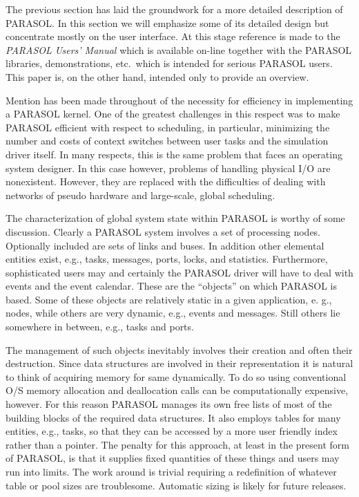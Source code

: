 \documentclass[11pt]{article}
\begin{document}
The previous section has laid the groundwork for a more detailed description of PARASOL. In
this section we will emphasize some of its detailed design but concentrate mostly on the user
interface. At this stage reference is made to the \emph{PARASOL Users' Manual} which is available
on-line together with the PARASOL libraries, demonstrations, etc.\ which is intended for serious
PARASOL users. This paper is, on the other hand, intended only to provide an overview.

Mention has been made throughout of the necessity for efficiency in implementing a PARASOL
kernel. One of the greatest challenges in this respect was to make PARASOL efficient with respect
to scheduling, in particular, minimizing the number and costs of context switches between user
tasks and the simulation driver itself. In many respects, this is the same problem that faces an
operating system designer. In this case however, problems of handling physical I/O are
nonexistent. However, they are replaced with the difficulties of dealing with networks of pseudo
hardware and large-scale, global scheduling.

The characterization of global system state within PARASOL is worthy of some discussion.
Clearly a PARASOL system involves a set of processing nodes. Optionally included are sets of
links and buses. In addition other elemental entities exist, e.g., tasks, messages, ports, locks, and
statistics. Furthermore, sophisticated users may and certainly the PARASOL driver will have to
deal with events and the event calendar. These are the ``objects'' on which PARASOL is based.
Some of these objects are relatively static in a given application, e. g., nodes, while others are very
dynamic, e.g., events and messages. Still others lie somewhere in between, e.g., tasks and ports.

The management of such objects inevitably involves their creation and often their destruction.
Since data structures are involved in their representation it is natural to think of acquiring memory
for same dynamically. To do so using conventional O/S memory allocation and deallocation calls
can be computationally expensive, however. For this reason PARASOL manages its own free lists
of most of the building blocks of the required data structures. It also employs tables for many
entities, e.g., tasks, so that they can be accessed by a more user friendly index rather than a
pointer. The penalty for this approach, at least in the present form of PARASOL, is that it supplies
fixed quantities of these things and users may run into limits. The work around is trivial requiring
a redefinition of whatever table or pool sizes are troublesome. Automatic sizing is likely for future
releases.
\end{document}
